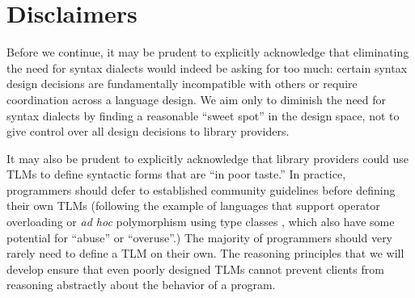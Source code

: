 \section{Disclaimers}
Before we continue, it may be prudent to explicitly acknowledge that eliminating the need for syntax dialects would indeed be asking for too much: certain syntax design decisions are fundamentally incompatible with others or require coordination across a language design. We aim only to diminish the need for syntax dialects by finding a reasonable ``sweet spot'' in the design space, not to give control over all design decisions to library providers. %

It may also be prudent to explicitly acknowledge that library providers could use TLMs  to define syntactic forms that are ``in poor taste.'' In practice, programmers should defer to established community guidelines before defining their own TLMs (following the example of languages that support operator overloading or \emph{ad hoc} polymorphism using type classes \cite{Hall:1996:TCH:227699.227700,conf/popl/DreyerHCK07}, which also have some potential for ``abuse'' or ``overuse''.) %
The majority of programmers should very rarely need to define a TLM on their own. The reasoning principles that we will develop ensure that even poorly designed TLMs cannot prevent clients from reasoning abstractly about the behavior of a program.

